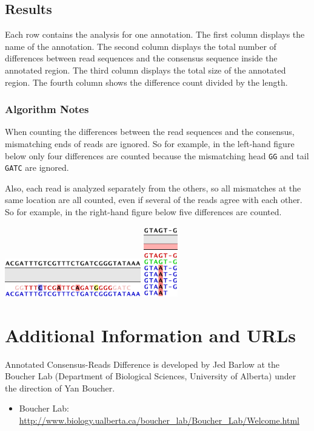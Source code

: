 \documentclass[12pt,letterpaper]{article}
\begin{document}
\subsection{Results}

Each row contains the analysis for one annotation.  The first column displays
the name of the annotation.  The second column displays the total number of
differences between read sequences and the consensus sequence inside the
annotated region.  The third column displays the total size of the annotated
region.  The fourth column shows the difference count divided by the length.

\subsubsection{Algorithm Notes}

When counting the differences between the read sequences and the consensus,
mismatching ends of reads are ignored.  So for example, in the left-hand figure
below only four differences are counted because the mismatching head
\texttt{GG} and tail \texttt{GATC} are ignored.

Also, each read is analyzed separately from the others, so all mismatches at
the same location are all counted, even if several of the reads agree with each
other. So for example, in the right-hand figure below five differences are
counted.

\begin{center}
    \includegraphics[width=16em]{mismatch_ends_ignored.png}
    \quad
    \includegraphics[width=4em]{repeats_all_counted.png}
\end{center}

\section{Additional Information and URLs}

Annotated Consensus-Reads Difference is developed by Jed Barlow at the Boucher
Lab (Department of Biological Sciences, University of Alberta) under the
direction of Yan Boucher.

\begin{itemize}
    \item
        Boucher Lab: \url{http://www.biology.ualberta.ca/boucher\_lab/Boucher\_Lab/Welcome.html}
\end{itemize}
\end{document}
